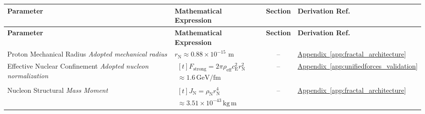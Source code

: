 \vspace{0.5cm}
\noindent
\begin{longtable}{@{} p{4.5cm} p{6cm} c p{4cm} @{}}
\toprule
\textbf{Parameter} & \textbf{Mathematical Expression} & \textbf{Section} & \textbf{Derivation Ref.} \\
\midrule
\endfirsthead
\toprule
\textbf{Parameter} & \textbf{Mathematical Expression} & \textbf{Section} & \textbf{Derivation Ref.} \\
\midrule
\endhead

{\raggedright Proton Mechanical Radius \newline \textit{Adopted mechanical radius}\par} & {\raggedright $r_{\mathrm{N}} \approx 0.88 \times 10^{-15} \text{ m}$\par} & -- & {\raggedright \hyperref[app:fractal_architecture]{Appendix~\ref*{app:fractal_architecture}}\par} \\

{\raggedright Effective Nuclear Confinement \newline \textit{Adopted nucleon normalization}\par} & {\raggedright $\begin{gathered}[t]F_{\mathrm{strong}}=2\pi\rho_{\mathrm{eff}}c_{\mathrm E}^2r_{\mathrm N}^2 \\ \approx1.6\,\mathrm{GeV/fm}\end{gathered}$\par} & -- & {\raggedright \hyperref[app:unifiedforces_validation]{Appendix~\ref*{app:unifiedforces_validation}}\par} \\

{\raggedright Nucleon Structural \newline \textit{Mass Moment}\par} & {\raggedright $\begin{gathered}[t]J_{\mathrm N}=\rho_{\mathrm N}r_{\mathrm N}^4 \\ \approx3.51\times10^{-43}\,\mathrm{kg\,m}\end{gathered}$\par} & -- & {\raggedright \hyperref[app:fractal_architecture]{Appendix~\ref*{app:fractal_architecture}}\par} \\


\end{longtable}
